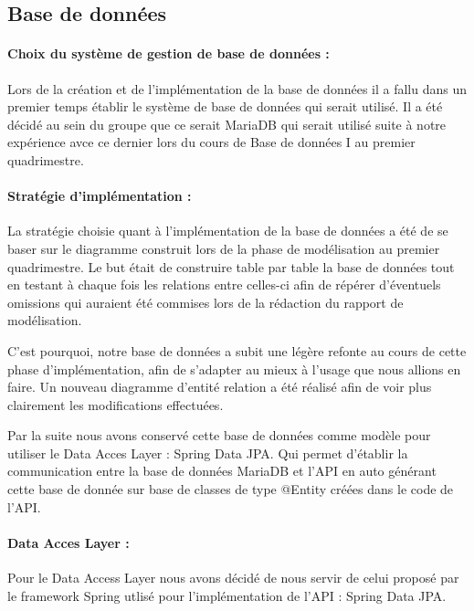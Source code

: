 \documentclass[../rapport.tex]{subfiles}
\begin{document}
\subsection{Base de données}
	
	\paragraph{Choix du système de gestion de base de données :}
		Lors de la création et de l'implémentation de la base de données il a fallu dans un
		premier temps établir le système de base de données qui serait utilisé. 
		Il a été décidé au sein du groupe que ce serait MariaDB qui serait utilisé suite
		à notre expérience avce ce dernier lors du cours de Base de données I au premier
		quadrimestre.
	
	\bigskip 
	
	\paragraph{Stratégie d'implémentation : }
		La stratégie choisie quant à l'implémentation de la base de données a été de se baser
		sur le diagramme construit lors de la phase de modélisation au premier quadrimestre.
		Le but était de construire table par table la base de données tout en testant à chaque
		fois les relations entre celles-ci afin de répérer d'éventuels omissions qui auraient été
		commises lors de la rédaction du rapport de modélisation.

		\medskip

		C'est pourquoi, notre base de données a subit une légère refonte au cours de cette phase
		d'implémentation, afin de s'adapter au mieux à l'usage que nous allions en faire. Un 
		nouveau diagramme d'entité relation a été réalisé afin de voir plus clairement les 
		modifications effectuées.

		\medskip
		
		Par la suite nous avons conservé cette base de données comme modèle pour utiliser le 
		Data Acces Layer : Spring Data JPA. Qui permet d'établir la communication entre la
		base de données MariaDB et l'API en auto générant cette base de donnée sur base de 
		classes de type @Entity créées dans le code de l'API.
		
	\bigskip

	\paragraph{Data Acces Layer : }
	Pour le Data Access Layer nous avons décidé de nous servir de celui proposé par le framework
	Spring utlisé pour l'implémentation de l'API : Spring Data JPA.
\end{document}
